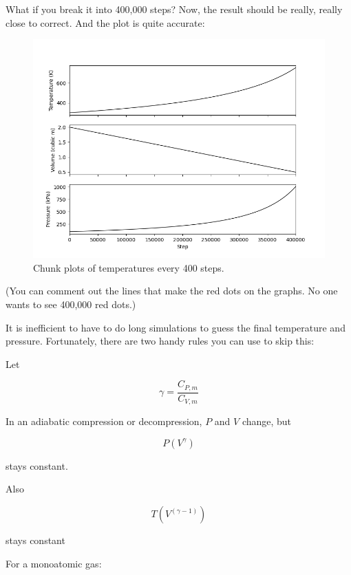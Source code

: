 What if you break it into 400,000 steps? Now, the result should be really, really close to correct. And the plot is quite accurate:
\begin{figure}[htbp]
    \centering
    \includegraphics[width=\textwidth]{chunkplot2.png}
    \caption{Chunk plots of temperatures every 400 steps.}
    \label{fig:chunkplot2}
\end{figure}

(You can comment out the lines that make the red dots on the graphs. No
one wants to see 400,000 red dots.)

It is inefficient to have to do long simulations to guess the final temperature and pressure. Fortunately, there are two handy rules you can use to skip this:
\begin{mdframed}[style=important, frametitle={Adiabatic Compression and Decompression}]

Let 

$$\gamma = \frac{C_{P,m}}{C_{V,m}}$$

In an adiabatic compression or decompression, $P$ and $V$ change, but

$$P \left(V^\gamma \right)$$

stays constant.

Also 

$$T \left(V^{\left( \gamma - 1 \right)} \right)$$

stays constant

\end{mdframed}

For a monoatomic gas:

